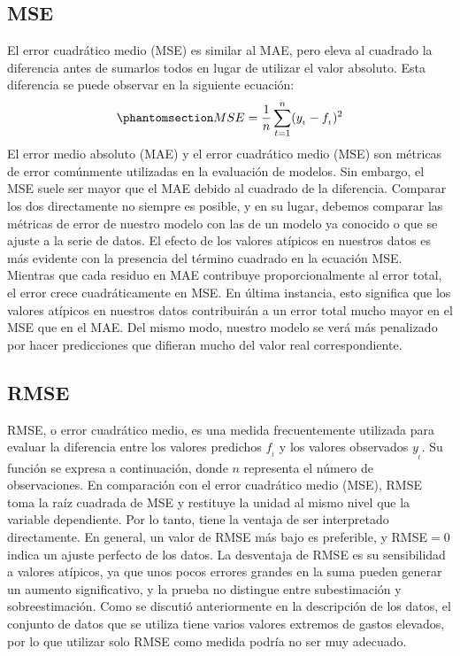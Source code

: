 \documentclass[
  us-letterpaper,
]{scrreprt}
\theoremstyle{plain}
\theoremstyle{definition}
\theoremstyle{plain}
\theoremstyle{definition}
\theoremstyle{remark}
\begin{document}
\subsection{MSE}\label{mse}

El error cuadrático medio (MSE) es similar al MAE, pero eleva al
cuadrado la diferencia antes de sumarlos todos en lugar de utilizar el
valor absoluto. Esta diferencia se puede observar en la siguiente
ecuación:
\begin{equation}\phantomsection\label{eq-MSE}{MSE=\frac{1}{n} \sum_{t=1}^n (y_{_t}-f_{_t})^2}\end{equation}
El error medio absoluto (MAE) y el error cuadrático medio (MSE) son
métricas de error comúnmente utilizadas en la evaluación de modelos. Sin
embargo, el MSE suele ser mayor que el MAE debido al cuadrado de la
diferencia. Comparar los dos directamente no siempre es posible, y en su
lugar, debemos comparar las métricas de error de nuestro modelo con las
de un modelo ya conocido o que se ajuste a la serie de datos. El efecto
de los valores atípicos en nuestros datos es más evidente con la
presencia del término cuadrado en la ecuación MSE. Mientras que cada
residuo en MAE contribuye proporcionalmente al error total, el error
crece cuadráticamente en MSE. En última instancia, esto significa que
los valores atípicos en nuestros datos contribuirán a un error total
mucho mayor en el MSE que en el MAE. Del mismo modo, nuestro modelo se
verá más penalizado por hacer predicciones que difieran mucho del valor
real correspondiente.

\subsection{RMSE}\label{rmse}

RMSE, o error cuadrático medio, es una medida frecuentemente utilizada
para evaluar la diferencia entre los valores predichos \(f_{_t}\) y los
valores observados \(y_{_t}\). Su función se expresa a continuación,
donde \(n\) representa el número de observaciones. En comparación con el
error cuadrático medio (MSE), RMSE toma la raíz cuadrada de MSE y
restituye la unidad al mismo nivel que la variable dependiente. Por lo
tanto, tiene la ventaja de ser interpretado directamente. En general, un
valor de RMSE más bajo es preferible, y RMSE\(=0\) indica un ajuste
perfecto de los datos. La desventaja de RMSE es su sensibilidad a
valores atípicos, ya que unos pocos errores grandes en la suma pueden
generar un aumento significativo, y la prueba no distingue entre
subestimación y sobreestimación. Como se discutió anteriormente en la
descripción de los datos, el conjunto de datos que se utiliza tiene
varios valores extremos de gastos elevados, por lo que utilizar solo
RMSE como medida podría no ser muy adecuado.
\end{document}
